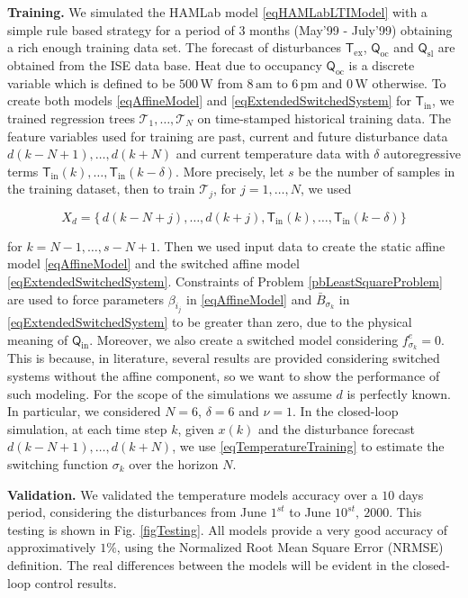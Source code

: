 \documentclass[letterpaper, 10 pt, conference]{ifacconf}  %
\begin{document}
\textbf{Training.} We simulated the HAMLab model \eqref{eqHAMLabLTIModel} with a simple rule based strategy for a period of 3 months (May'99 - July'99) obtaining a rich enough training data set. The forecast of disturbances $\mathsf{T}_{\mathrm{ex}}$, $\mathsf{Q}_{\mathrm{oc}}$ and $\mathsf{Q}_{\mathrm{sl}}$ are obtained from the ISE data base. Heat due to occupancy $\mathsf{Q}_{\mathrm{oc}}$ is a discrete variable which is defined to be $500\,\mathrm{W}$ from $8\,\mathrm{am}$ to $6\,\mathrm{pm}$ and $0\,\mathrm{W}$ otherwise.
To create both models \eqref{eqAffineModel} and \eqref{eqExtendedSwitchedSystem} for $\mathsf{T}_{\mathrm{in}}$, we trained regression trees $\mathcal{T}_1,\ldots,\mathcal{T}_N$ on time-stamped historical training data. The feature variables used for training are past, current and future disturbance data $d(k-N+1),\ldots,d(k+N)$ and  current temperature data with $\delta$ autoregressive terms $\mathsf{T}_{\mathrm{in}}(k),\ldots,\mathsf{T}_{\mathrm{in}}(k-\delta)$. More precisely, let $s$ be the number of samples in the training dataset, then to train $\mathcal{T}_j$, for $j=1,\ldots,N$, we used

\small
\begin{equation}\label{eqTemperatureTraining}
X_d = \{\,d(k-N+j), \ldots, d(k+j),\mathsf{T}_{\mathrm{in}}(k),\ldots,\mathsf{T}_{\mathrm{in}}(k-\delta)\}
\end{equation}
\normalsize

for $k=N-1,\ldots,s-N+1$. Then we used input data to create the static affine model \eqref{eqAffineModel} and the switched affine model \eqref{eqExtendedSwitchedSystem}. Constraints of Problem \ref{pbLeastSquareProblem} are used to force parameters $\beta_{i_j}$ in \eqref{eqAffineModel} and $\bar B_{\sigma_k}$ in \eqref{eqExtendedSwitchedSystem} to be greater than zero, due to the physical meaning of $\mathsf{Q}_{\mathrm{in}}$. Moreover, we also create a switched model considering $f^e_{\sigma_k} = 0$. This is because, in literature, several results are provided considering switched systems without the affine component, so we want to show the performance of such modeling. For the scope of the simulations we assume $d$ is perfectly known. In particular, we considered $N=6$, $\delta=6$ and $\nu = 1$. In the closed-loop simulation, at each time step $k$, given $x(k)$ and the disturbance forecast $d(k-N+1),\ldots,d(k+N)$, we use \eqref{eqTemperatureTraining} to estimate the switching function $\sigma_k$ over the horizon $N$.

\textbf{Validation.}  We validated the temperature models accuracy over a $10$ days period, considering the disturbances from June $1^{st}$ to June $10^{st},\ 2000$. This testing is shown in Fig. \ref{figTesting}. All models provide a very good accuracy of approximatively $1\%$, using the Normalized Root Mean Square Error (NRMSE) definition. The real differences between the models will be evident in the closed-loop control results.
\end{document}
